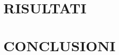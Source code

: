 \documentclass{article_saj}
\begin{document}
\section{RISULTATI}
\indent








\section{CONCLUSIONI}
\indent












\newcommand\eprint{in press }

\bibsep=0pt



{\small


}







\end{document}
